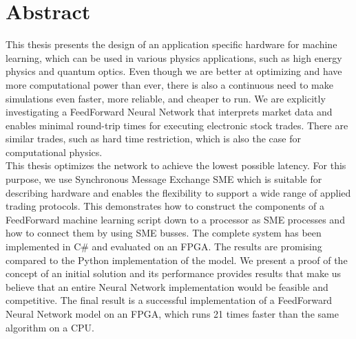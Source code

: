 \section*{Abstract}%
\label{sec:abstract}
This thesis presents the design of an application
specific hardware for machine learning, which can be used in various physics applications, such as high energy physics and quantum optics.
Even though we are better at optimizing and have more computational power than ever, there is also a continuous need to make simulations even faster, more reliable, and cheaper to run. We are explicitly investigating a FeedForward Neural Network that interprets market data and enables minimal
round-trip times for executing electronic stock trades. There are similar trades, such as hard time restriction, which is also the case for computational physics. \\
This thesis optimizes the network to achieve the lowest possible latency. For this purpose, we use Synchronous Message Exchange \acrshort{SME} which is suitable for describing hardware and enables the flexibility to support a wide range of applied trading protocols. This demonstrates how to construct the components of a FeedForward machine learning script down to a processor as SME processes and how to connect them by
using SME busses. The complete system has been implemented in C\# and evaluated on an \acrshort{FPGA}. The results are promising compared to the Python implementation of the model. We present a proof
of the concept of an initial solution and its performance provides
results that make us believe that an entire Neural Network 
implementation would be feasible and competitive.
The final result is a successful implementation of a FeedForward Neural Network model on an FPGA, which runs 21 times faster than the same algorithm on a CPU.\\


